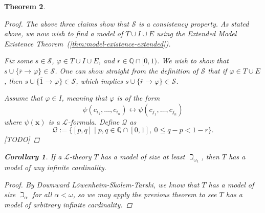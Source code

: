 \documentclass{amsart}
\newtheorem{theorem}{Theorem}[section]
\newtheorem{corollary}[theorem]{Corollary}
\theoremstyle{definition}
\numberwithin{equation}{theorem}
\renewcommand{\phi}{\varphi}
\newcommand{\Q}{\mathbb{Q}}
\newcommand{\V}{\mathbf}
\newcommand{\where}{\mid}
\newcommand{\rat}[1]{{\overline{#1}}}
\newcommand{\narrow}[1]{\xrightarrow{#1}}
\renewcommand{\to}{\narrow{}}
\newcommand{\frag}{\mathcal{L}}
\begin{document}
\begin{theorem}
\begin{proof}
    The above three claims show that $\mathscr{S}$ is a consistency property.
    As stated above, we now wish to find a model of $T\cup I\cup E$ using the Extended Model Existence Theorem~(\ref{thm:model-existence-extended}).
    
    Fix some $s\in \mathscr{S}$, $\phi\in T\cup I\cup E$, and $r\in\Q\cap[0,1)$.
    We wish to show that $s\cup\{\rat r\to\phi\}\in \mathscr{S}$.
    One can show straight from the definition of $\mathscr{S}$ that if $\phi\in T\cup E$, then $s\cup\{\rat 1\to\phi\}\in \mathscr{S}$, which implies $s\cup\{\rat r\to\phi\}\in \mathscr{S}$.
    
    Assume that $\phi\in I$, meaning that $\phi$ is of the form
    \[
      \psi(c_{i_1},\dots,c_{i_n})\leftrightarrow \psi(c_{j_1},\dots,c_{j_n})
    \]
    where $\psi(\V x)$ is a $\frag$-formula.
    Define $\mathcal Q$ as
    \[
      \mathcal Q:=\{[p,q]\where p,q\in\Q\cap[0,1],\ 0\leq q-p<1-r\}.
    \]
    [TODO]
  \end{proof}
  \begin{corollary}\label{cor:lst}
    If a $\frag$-theory $T$ has a model of size at least $\beth_{\omega_1}$, then $T$ has a model of any infinite cardinality.
    \begin{proof}
      By Downward L\"owenheim-Skolem-Tarski, we know that $T$ has a model of size $\beth_\alpha$ for all $\alpha<\omega$, so we may apply the previous theorem to see $T$ has a model of arbitrary infinite cardinality.
    \end{proof}
  \end{corollary}
\end{theorem}
\end{document}
